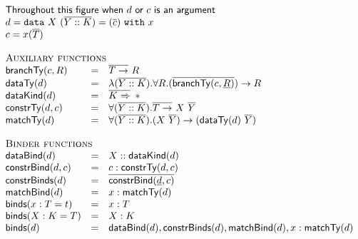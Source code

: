 \newcommand{\gammaterm}{\Gamma^{\textrm{term}}}
\newcommand{\gammatype}{\Gamma^{\textrm{type}}}
\newcommand{\gammadata}{\Gamma^{\textrm{data}}}
\newcommand{\gammarhs}{\Gamma^{\textrm{rhs}}}
\newcommand{\gammanew}{\Gamma^{\prime}}
\newcommand{\gammadatarhs}[1]{\Gamma_{#1}}

\newcommand{\maxTerm}{n}
\newcommand{\maxType}{m}
\newcommand{\maxData}{o}
\newcommand{\maxArg}{k}
\newcommand{\maxConstr}{l}

\begin{figure}[!t]
  \centering
  \begin{displaymath}
  \begin{array}{lll}
  \multicolumn{3}{l}{\textsf{Throughout this figure when $d$ or $c$ is an argument}}\\
  \multicolumn{3}{l}{d = \datatype{X}{(\seq{Y :: K})}{x}{(\seq{c})}} \\
  \multicolumn{3}{l}{c = x(\seq{T})}\\
  \\
  \multicolumn{3}{l}{\textsc{Auxiliary functions}}\\
  \branchTy{c}{R}
  &=& \seqFunArr{T}{R} \\
  \scottTy{d}
  &=& \lambda (\seq{Y::K}) . \forall R . (\seq{\branchTy{c}{\fixed{R}}}) \rightarrow R  \\
  \dataKind{d}
  &=& \seqKindArr{K}{\Type} \\
  \constrTy{d}{c}
  &=& \forall (\seq{Y::K}). \seqFunArr{T}{X\ \seq{Y}}\\
  \matchTy{d}
  &=& \forall (\seq{Y::K}) . (X\ \seq{Y}) \rightarrow (\scottTy{d}\ \seq{Y})\\
  \\
  \multicolumn{3}{l}{\textsc{Binder functions}}\\
  \dataBind{d}
  &=& X :: \dataKind{d}\\
  \constrBind{d}{c}
  &=& c : \constrTy{d}{c}\\
  \constrBinds{d}
  &=& \seq{\constrBind{\fixed{d}}{c}}\\
  \matchBind{d}
  &=& x : \matchTy{d}\\
  \binds{x : T = t}&=&x:T\\
  \binds{X : K = T}&=&X:K\\
  \binds{d}&=& \dataBind{d}, \constrBinds{d}, \matchBind{d}, x : \matchTy{d}\\
  \end{array}
  \end{displaymath}
  \label{fig:fir_aux}
\end{figure}

